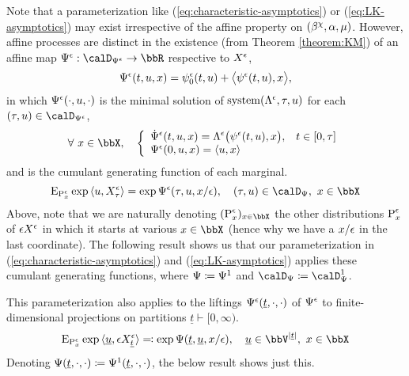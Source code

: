 Note that a parameterization like (\ref{eq:characteristic-asymptotics}) or (\ref{eq:LK-asymptotics}) may exist irrespective of the affine property on $(\beta^\chi, \alpha, \mu)$.
However, affine processes are distinct in the existence (from Theorem \ref{theorem:KM}) of an affine map $\aff^\epsilon: \momentSpacee \rightarrow \bbR$ respective to $X^\epsilon$,
\begin{equation*}
  \Psi^\epsilon(t, u, x) = \psi^\epsilon_0(t,u) + {\big\langle \psi^\epsilon(t,u) , x \big\rangle},
\end{equation*}
in which $\Psi^\epsilon(\cdot, u, \cdot)$ is the minimal solution of $\operatorname{system}(\Lambda^\epsilon, \tau, u)$ for each $(\tau, \momentVar) \in \momentSpacee$,
\begin{equation*}
  \forall~ \stateVar \in \stateSpace, \quad \left\{\begin{array}{ll}
    \displaystyle \dot\aff^\epsilon(t, \momentVar, \stateVar) = \ode^\epsilon\big( \affPart^\epsilon(t, \momentVar), \stateVar \big), & t \in [0,\tau] \\
    \aff^\epsilon(0, \momentVar, \stateVar) = \prj{\momentVar}{\stateVar}
  \end{array}\right.
\end{equation*}
and is the cumulant generating function of each marginal.
\begin{equation*}
  \Exp_{\Prb^\epsilon_\stateVar} \exp\prj{\momentVar}{\Xee_\tau} = \exp\aff^\epsilon(\tau, \momentVar, \stateVar/\epsilon), \quad (\tau, \momentVar) \in \momentSpace, ~ \stateVar \in \stateSpace
\end{equation*}
Above, note that we are naturally denoting $(\Prb^\epsilon_\stateVar)_{\stateVar\in\stateSpace}$ the other distributions ${\operatorname{P}}^\epsilon_x$ of $\epsilon X^\epsilon$ in which it starts at various $\stateVar \in \stateSpace$ (hence why we have a $x/\epsilon$ in the last coordinate).
The following result shows us that our parameterization in (\ref{eq:characteristic-asymptotics}) and (\ref{eq:LK-asymptotics}) applies these cumulant generating functions, where $\Psi \coloneqq \Psi^1$ and $\momentSpace \defeq \momentSpace^1$.




This parameterization also applies to the liftings $\Psi^\epsilon(\underline t, \cdot, \cdot)$ of $\Psi^\epsilon$ to finite-dimensional projections on partitions $\underline t \vdash [0,\infty)$.
\begin{equation*}
  \Exp_{\Prb^\epsilon_\stateVar}\exp\prj{\underline\momentVar}{\Xe_{\underline t}} \eqdef \exp\aff(\underline t, \underline\momentVar, \stateVar/\epsilon), \quad \underline\momentVar \in \vecSpace^{|\underline t|}, ~ \stateVar\in \stateSpace
\end{equation*}
Denoting $\Psi(\underline t, \cdot, \cdot) \coloneqq \Psi^1(\underline t, \cdot, \cdot)$, the below result shows just this.

